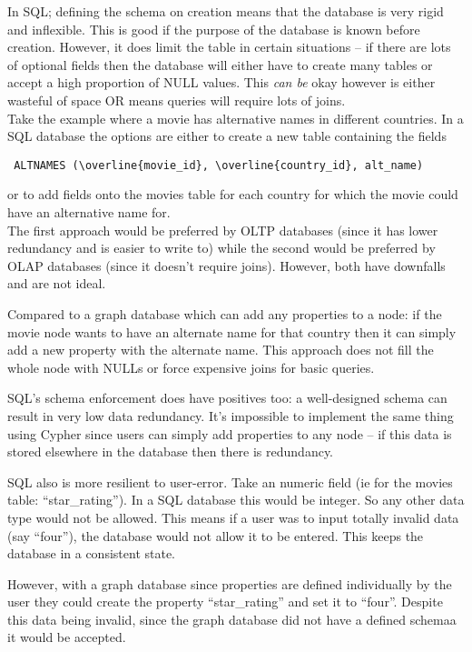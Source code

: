\documentclass[10pt,\jkfside,a4paper]{article}
\begin{document}
\begin{enumerate}
In SQL; defining the schema on creation means that the database is very rigid 
and inflexible. This is good if the purpose of the database is known before 
creation. However, it does limit the table in certain situations --
 if there are lots of optional 
fields then the database will either have to create many tables or accept a high 
proportion of NULL values. This \textit{can be} okay however is either wasteful 
of space OR means queries will require lots of joins.\\
Take the example where a movie has alternative names in different countries.
In a SQL database the options are either to create a new table containing the 
fields \begin{verbatim} ALTNAMES (\overline{movie_id}, \overline{country_id}, alt_name)\end{verbatim} 
or to add fields onto the movies table for each country for which the movie could 
have an alternative name for.\\
The first approach would be preferred by OLTP databases (since it has lower redundancy 
and is easier to write to) while the second would be preferred by OLAP databases 
(since it doesn't require joins).
However, both have downfalls and are not ideal.

Compared to a graph database which can add any properties to a node:
if the movie node wants to have an alternate name for that country then it can 
simply add a new property with the alternate name. This approach does not fill 
the whole node with NULLs or force expensive joins for basic queries.

SQL's schema enforcement does have positives too: a well-designed schema can 
result in very low data redundancy. It's impossible to implement the same thing 
using Cypher since users can simply add properties to any node -- if this data is 
stored elsewhere in the database then there is redundancy.

SQL also is more resilient to user-error. Take an numeric field (ie for the movies table: 
``star\_rating''). 
In a SQL database this would be integer. So any other data type would not be allowed. 
This means if a user was to input totally invalid data (say ``four''), the database 
would not allow it to be entered. This keeps the database in a consistent state. 

However, with a graph database since properties are defined individually by the user 
they could create the property ``star\_rating'' and set it to ``four''. Despite this 
data being invalid, since the graph database did not have a defined schemaa it would 
be accepted.


\end{enumerate}
\end{document}
